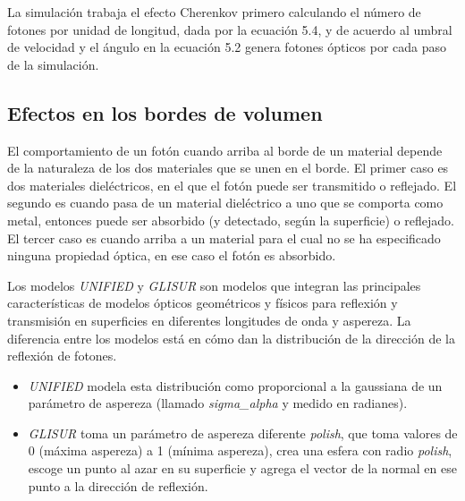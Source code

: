 \documentclass{book}
\begin{document}
La simulaci\'on trabaja el efecto Cherenkov primero calculando el n\'umero de fotones por unidad de longitud, dada por la ecuaci\'on 5.4, y de acuerdo al umbral de velocidad y el \'angulo en la ecuaci\'on 5.2 genera fotones \'opticos por cada paso de la simulaci\'on.

\subsection{Efectos en los bordes de volumen}
El comportamiento de un fot\'on cuando arriba al borde de un material depende de la naturaleza de los dos materiales que se unen en el borde. El primer caso es dos materiales diel\'ectricos, en el que el fot\'on puede ser transmitido o reflejado. El segundo es cuando pasa de un material diel\'ectrico a uno que se comporta como metal, entonces puede ser absorbido (y detectado, seg\'un la superficie) o reflejado. El tercer caso es cuando arriba a un material para el cual no se ha especificado ninguna propiedad \'optica, en ese caso el fot\'on es absorbido.

Los modelos \textit{UNIFIED} y \textit{GLISUR} son modelos que integran las principales caracter\'isticas de modelos \'opticos geom\'etricos y f\'isicos para reflexi\'on y transmisi\'on en superficies en diferentes longitudes de onda y aspereza. La diferencia entre los modelos est\'a en c\'omo dan la distribuci\'on de la direcci\'on de la reflexi\'on de fotones.

\begin{itemize}
\item \textit{UNIFIED} modela esta distribuci\'on como proporcional a la gaussiana de un par\'ametro de aspereza (llamado \textit{sigma\_alpha} y medido en radianes).
\item \textit{GLISUR}	toma un par\'ametro de aspereza diferente \textit{polish}, que toma valores de 0 (m\'axima aspereza) a 1 (m\'inima aspereza), crea una esfera con radio \textit{polish}, escoge un punto al azar en su superficie y agrega el vector de la normal en ese punto a la direcci\'on de reflexi\'on.
\end{itemize}
\end{document}

